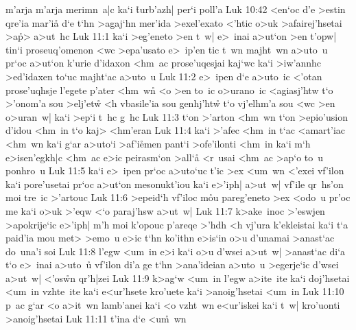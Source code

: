 m'arja
m'arja
merimn~a|c
ka`i
\r{t}urb'azh|
per`i
poll'a\bibvsend
\vs Luk 10:42
<en`oc
d'e
>estin
qre'ia
mar'ia\r{}
d`e
t`hn
>agaj`hn
mer'ida
>exel'exato
<'htic
o>uk
>afairej'hsetai
>a\r{p}>
a>ut~hc\bibvsend
\vs Luk 11:1
ka`i
>eg'eneto
>en
t~w|
e>~inai
a>ut`on
>en
t'opw|
tin`i
proseuq'omenon
<wc
>epa'usato
e>~ip'en
tic
t~wn
majht~wn
a>uto~u
pr`oc
a>ut`on
k'urie
d'idaxon
<hm~ac
prose'uqesjai
kaj`wc
ka`i
>iw'annhc
>ed'idaxen
to`uc
majht`ac
a>uto~u\bibvsend
\vs Luk 11:2
e>~ipen
d`e
a>uto~ic
<'otan
prose'uqhsje
l'egete
p'ater
<hm~wn\r{}
<o
>en
to~ic
o>urano~ic
<agiasj'htw
t`o
>'onom'a
sou
>elj'etw\r{}
<h
vbasile'ia
sou
genhj'htw\r{}
t`o
vj'elhm'a
sou
<wc
>en
o>uran~w|
ka`i
>ep`i
t~hc
g~hc\bibvsend
\vs Luk 11:3
t`on
>'arton
<hm~wn
t`on
>epio'usion
d'idou
<hm~in
t`o
kaj>
<hm'eran\bibvsend
\vs Luk 11:4
ka`i
>'afec
<hm~in
t`ac
<amart'iac
<hm~wn
ka`i
g`ar
a>uto`i
>af'i\r{e}men
pant`i
>ofe'ilonti
<hm~in
ka`i
m`h
e>isen'egkh|c
<hm~ac
e>ic
peirasm`on
>all`a\r{}
<r~usai
<hm~ac
>ap`o
to~u
ponhro~u\bibvsend
\vs Luk 11:5
ka`i
e>~ipen
pr`oc
a>uto`uc
t'ic
>ex
<um~wn
<'exei
vf'ilon
ka`i
pore'usetai
pr`oc
a>ut`on
mesonukt'iou
ka`i
e>'iph|
a>ut~w|
vf'ile
qr~hs'on
moi
tre~ic
>'artouc\bibvsend
\vs Luk 11:6
>epeid`h
vf'iloc
m\r{o}u
pareg'eneto
>ex
<odo~u
pr'oc
me
ka`i
o>uk
>'eqw
<`o
paraj'hsw
a>ut~w|\bibvsend
\vs Luk 11:7
k>ake~inoc
>'eswjen
>apokrije`ic
e>'iph|
m'h
moi
k'opouc
p'areqe
>'hdh
<h
vj'ura
k'ekleistai
ka`i
t`a
paid'ia
mou
met>
>emo~u
e>ic
t`hn
ko'ithn
e>is`in
o>u
d'unamai
>anast`ac
do~una'i
soi\bibvsend
\vs Luk 11:8
l'egw
<um~in
e>i
ka`i
o>u
d'wsei
a>ut~w|
>anast`ac
di`a
t`o
e>~inai
a>uto~u\r{}
vf'ilon
di'a
ge
t`hn
>ana'ideian
a>uto~u
>egerje`ic
d'wsei
a>ut~w|
<'os\r{w}n
qr'h|zei\bibvsend
\vs Luk 11:9
k>ag`w
<um~in
l'egw
a>ite~ite
ka`i
doj'hsetai
<um~in
vzhte~ite
ka`i
e<ur'hsete
kro'uete
ka`i
>anoig'hsetai
<um~in\bibvsend
\vs Luk 11:10
p~ac
g`ar
<o
a>it~wn
lamb'anei
ka`i
<o
vzht~wn
e<ur'iskei
ka`i
t~w|
kro'uonti
>anoig'hsetai\bibvsend
\vs Luk 11:11
t'ina
d`e
<u\r{m}~wn
